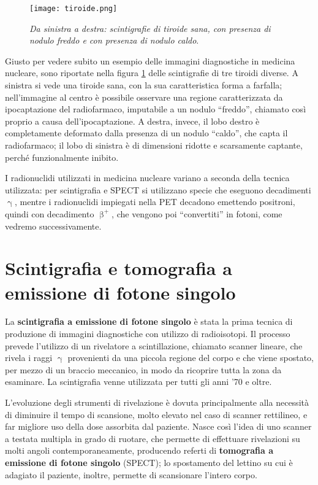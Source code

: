 \documentclass{report}
\newcommand{\virgolette}[1]{``#1''}
\newcommand{\figref}[1]{figura \ref{#1}}
\numberwithin{equation}{section}
\numberwithin{figure}{section}
\begin{document}
\begin{figure}[htp]
    \centering
    \texttt{[image: tiroide.png]}
    \caption{\label{fig:tiroide} \textit{Da sinistra a destra: scintigrafie di tiroide sana, con presenza di nodulo freddo e con presenza di nodulo caldo}.}
\end{figure}

Giusto per vedere subito un esempio delle immagini diagnostiche in medicina nucleare, sono riportate nella \figref{fig:tiroide} delle scintigrafie di tre tiroidi diverse. A sinistra si vede una tiroide sana, con la sua caratteristica forma a farfalla; nell'immagine al centro è possibile osservare una regione caratterizzata da ipocaptazione del radiofarmaco, imputabile a un nodulo \virgolette{freddo}, chiamato così proprio a causa dell'ipocaptazione. A destra, invece, il lobo destro è completamente deformato dalla presenza di un nodulo \virgolette{caldo}, che capta il radiofarmaco; il lobo di sinistra è di dimensioni ridotte e scarsamente captante, perché funzionalmente inibito.

I radionuclidi utilizzati in medicina nucleare variano a seconda della tecnica utilizzata: per scintigrafia e SPECT si utilizzano specie che eseguono decadimenti $\upgamma$, mentre i radionuclidi impiegati nella PET decadono emettendo positroni, quindi con decadimento $\upbeta^+$, che vengono poi \virgolette{convertiti} in fotoni, come vedremo successivamente.

\section{Scintigrafia e tomografia a emissione di fotone singolo}
La \textbf{scintigrafia a emissione di fotone singolo} è stata la prima tecnica di produzione di immagini diagnostiche con utilizzo di radioisotopi. Il processo prevede l'utilizzo di un rivelatore a scintillazione, chiamato scanner lineare, che rivela i raggi $\upgamma$ provenienti da una piccola regione del corpo e che viene spostato, per mezzo di un braccio meccanico, in modo da ricoprire tutta la zona da esaminare. La scintigrafia venne utilizzata per tutti gli anni '70 e oltre.

L'evoluzione degli strumenti di rivelazione è dovuta principalmente alla necessità di diminuire il tempo di scansione, molto elevato nel caso di scanner rettilineo, e far migliore uso della dose assorbita dal paziente. Nasce così l'idea di uno scanner a testata multipla in grado di ruotare, che permette di effettuare rivelazioni su molti angoli contemporaneamente, producendo referti di \textbf{tomografia a emissione di fotone singolo} (SPECT); lo spostamento del lettino su cui è adagiato il paziente, inoltre, permette di scansionare l'intero corpo.
\end{document}
